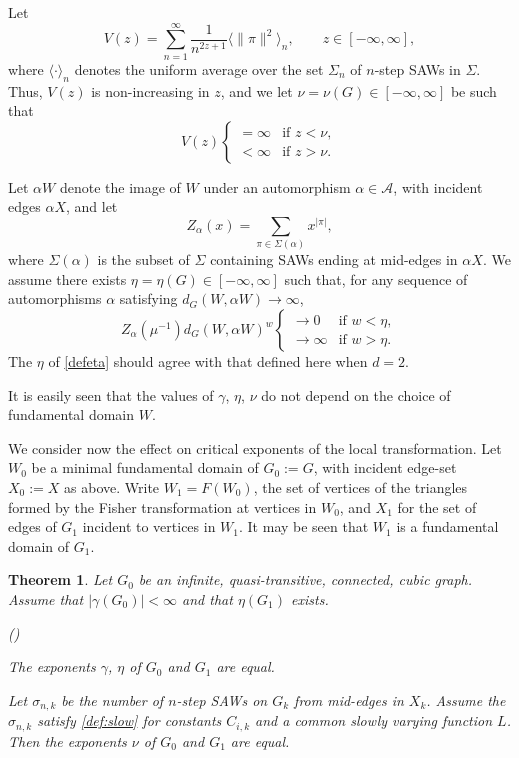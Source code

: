 \documentclass[12pt]{amsart}
\theoremstyle{plain}
\newtheorem{theorem}{Theorem}
\numberwithin{equation}{section}
\numberwithin{theorem}{section}
\numberwithin{figure}{section}
\newcounter{mycount}
\newenvironment{letlist}{\begin{list}{\rm(\alph{mycount})}%
   {\usecounter{mycount}\labelwidth=1cm\itemsep 0pt}}{\end{list}}
\newcommand\s{\sigma}
\newcommand\oo{\infty}
\newcommand\sA{{\mathcal A}}
\renewcommand\a{\alpha}
\newcommand\g{\gamma}
\begin{document}
Let
\begin{equation}\label{def0}
V(z)=\sum_{n=1}^{\infty}\frac{1}{n^{2z+1}} \langle \|\pi\|^2 \rangle_n,
\qquad z \in [-\oo,\oo],
\end{equation}
where $\langle \cdot \rangle_n$ denotes the uniform average over the
set $\Sigma_n$ of $n$-step SAWs in $\Sigma$.
Thus, $V(z)$ is non-increasing in $z$, and we let  
$\nu=\nu(G)\in[-\oo,\oo]$ be such that
$$
V(z) \begin{cases} =\infty &\text{if } z < \nu,\\
<\infty &\text{if } z > \nu.
\end{cases}
$$

Let $\a W$ denote the image of $W$ under an automorphism $\a\in\sA$, with incident
edges $\a X$, and let
\begin{equation*}
Z_\a(x)=\sum_{\pi\in\Sigma(\a)} x^{|\pi|},
\end{equation*}
where $\Sigma(\a)$ is the subset of $\Sigma$ containing SAWs ending 
at mid-edges in $\a X$.
We assume there exists $\eta =\eta(G) \in [-\oo,\oo]$ such that,
for any sequence of automorphisms $\a$ satisfying $d_G(W,\a W)\to\oo$,
\begin{equation}\label{dd1}
Z_\a(\mu^{-1})d_G(W,\a W)^{w} 
\begin{cases} \to 0 &\text{if } w<\eta,\\
\to\infty &\text{if } w>\eta. 
\end{cases}
\end{equation}
The $\eta$ of \eqref{defeta} should agree with that defined here when $d=2$.

It is easily seen that the values of $\g$, $\eta$, $\nu$ do not depend on the choice of
fundamental domain $W$. 

We consider now the effect on critical exponents of
the local transformation. 
Let $W_0$ be a minimal fundamental domain of $G_0 := G$, 
with incident edge-set $X_0 := X$ as above. Write $W_1=F(W_0)$, 
the set of vertices of the 
triangles formed by the Fisher transformation at vertices in $W_0$,
and $X_1$ for the set of edges of $G_1$ incident to vertices in $W_1$.
It may be seen that $W_1$ is a fundamental domain of $G_1$.



\begin{theorem}\label{thm:main2'}
Let $G_0$ be an infinite, quasi-transitive, connected, cubic graph.
Assume that $|\g(G_0)|<\oo$ and that $\eta(G_1)$ exists.
\begin{letlist}
\item The exponents $\g$, $\eta$ of $G_0$ and $G_1$ are equal.
\item  Let $\sigma_{n,k}$ be
the number of $n$-step SAWs on $G_k$ from mid-edges in $X_k$.
Assume the $\s_{n,k}$ satisfy \eqref{def:slow} for constants
$C_{i,k}$ and a common slowly varying function $L$. Then
the exponents $\nu$ of $G_0$ and $G_1$ are equal.
\end{letlist}
\end{theorem}
\end{document}
